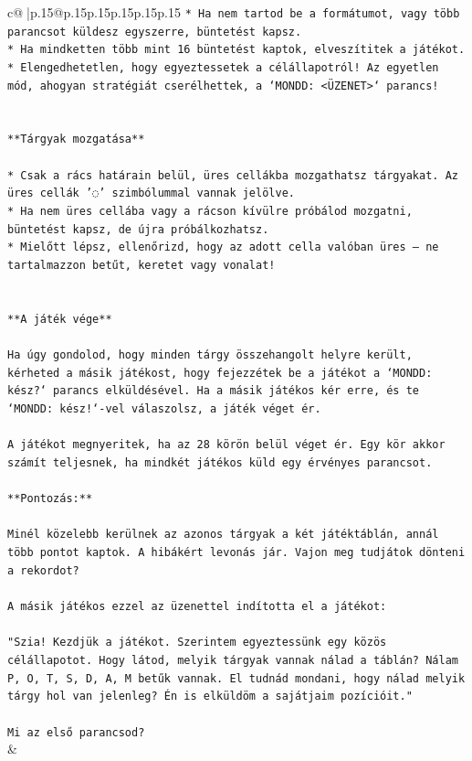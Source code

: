 \documentclass{article}
\begin{document}
{\begin{supertabular}{c@{$\;$}|p{.15\linewidth}@{}p{.15\linewidth}p{.15\linewidth}p{.15\linewidth}p{.15\linewidth}p{.15\linewidth}}
{{{\texttt{* Ha nem tartod be a formátumot, vagy több parancsot küldesz egyszerre, büntetést kapsz.} \\
\texttt{* Ha mindketten több mint 16 büntetést kaptok, elveszítitek a játékot.} \\
\texttt{* Elengedhetetlen, hogy egyeztessetek a célállapotról! Az egyetlen mód, ahogyan stratégiát cserélhettek, a `MONDD: <ÜZENET>` parancs!} \\
\\ 
\\ 
\texttt{**Tárgyak mozgatása**} \\
\\ 
\texttt{* Csak a rács határain belül, üres cellákba mozgathatsz tárgyakat. Az üres cellák '◌' szimbólummal vannak jelölve.} \\
\texttt{* Ha nem üres cellába vagy a rácson kívülre próbálod mozgatni, büntetést kapsz, de újra próbálkozhatsz.} \\
\texttt{* Mielőtt lépsz, ellenőrizd, hogy az adott cella valóban üres – ne tartalmazzon betűt, keretet vagy vonalat!} \\
\\ 
\\ 
\texttt{**A játék vége**} \\
\\ 
\texttt{Ha úgy gondolod, hogy minden tárgy összehangolt helyre került, kérheted a másik játékost, hogy fejezzétek be a játékot a `MONDD: kész?` parancs elküldésével. Ha a másik játékos kér erre, és te `MONDD: kész!`{-}vel válaszolsz, a játék véget ér.} \\
\\ 
\texttt{A játékot megnyeritek, ha az 28 körön belül véget ér. Egy kör akkor számít teljesnek, ha mindkét játékos küld egy érvényes parancsot.} \\
\\ 
\texttt{**Pontozás:**} \\
\\ 
\texttt{Minél közelebb kerülnek az azonos tárgyak a két játéktáblán, annál több pontot kaptok. A hibákért levonás jár. Vajon meg tudjátok dönteni a rekordot?} \\
\\ 
\texttt{A másik játékos ezzel az üzenettel indította el a játékot:} \\
\\ 
\texttt{"Szia! Kezdjük a játékot. Szerintem egyeztessünk egy közös célállapotot. Hogy látod, melyik tárgyak vannak nálad a táblán? Nálam P, O, T, S, D, A, M betűk vannak. El tudnád mondani, hogy nálad melyik tárgy hol van jelenleg? Én is elküldöm a sajátjaim pozícióit."} \\
\\ 
\texttt{Mi az első parancsod?} \\
            }
        }
    }
    & \\ \\


\end{supertabular}}
\end{document}
